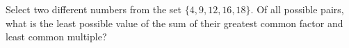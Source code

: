 Select two different numbers from the set $\{4,9,12,16,18\}$. Of all possible pairs, what is the least possible value of the sum of their greatest common factor and least common multiple?
